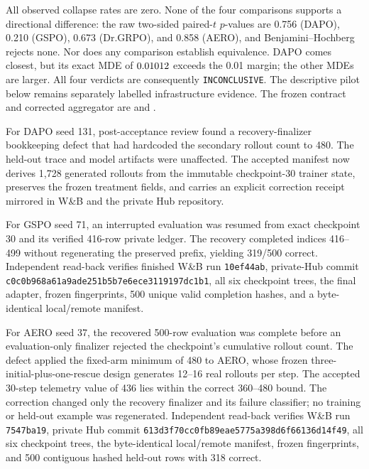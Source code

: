 \documentclass[11pt]{article}
\newcommand{\grpo}{\textsc{GRPO}}
\begin{document}
All observed collapse rates are zero. None of the four comparisons supports a
directional difference: the raw two-sided paired-$t$ $p$-values are 0.756
(DAPO), 0.210 (GSPO), 0.673 (Dr.\grpo{}), and 0.858 (AERO), and
Benjamini--Hochberg rejects none. Nor does any comparison establish
equivalence. DAPO comes closest, but its exact MDE of $0.01012$ exceeds
the 0.01 margin; the other MDEs are larger. All four verdicts are consequently
\texttt{INCONCLUSIVE}. The descriptive pilot below remains separately labelled
infrastructure evidence. The frozen contract and corrected aggregator are
 and
.

For DAPO seed 131, post-acceptance review found a recovery-finalizer
bookkeeping defect that had hardcoded the secondary rollout count to 480. The
held-out trace and model artifacts were unaffected. The accepted manifest now
derives 1,728 generated rollouts from the immutable checkpoint-30 trainer state,
preserves the frozen treatment fields, and carries an explicit correction
receipt mirrored in W\&B and the private Hub repository.

For GSPO seed 71, an interrupted evaluation was resumed from exact checkpoint
30 and its verified 416-row private ledger. The recovery completed indices
416--499 without regenerating the preserved prefix, yielding 319/500 correct.
Independent read-back verifies finished W\&B run \texttt{10ef44ab}, private-Hub
commit \texttt{c0c0b968a61a9ade251b5b7e6ece3119197dc1b1}, all six checkpoint
trees, the final adapter, frozen fingerprints, 500 unique valid completion
hashes, and a byte-identical local/remote manifest.

For AERO seed 37, the recovered 500-row evaluation was complete before an
evaluation-only finalizer rejected the checkpoint's cumulative rollout count.
The defect applied the fixed-arm minimum of 480 to AERO, whose frozen
three-initial-plus-one-rescue design generates 12--16 real rollouts per step.
The accepted 30-step telemetry value of 436 lies within the correct 360--480
bound. The correction changed only the recovery finalizer and its failure
classifier; no training or held-out example was regenerated. Independent
read-back verifies W\&B run \texttt{7547ba19}, private Hub commit
\texttt{613d3f70cc0fb89eae5775a398d6f66136d14f49}, all six checkpoint trees,
the byte-identical local/remote manifest, frozen fingerprints, and 500
contiguous hashed held-out rows with 318 correct.

\end{document}
